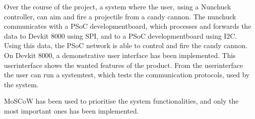 \noindent Over the course of the project, a system where the user, using a Nunchuck controller, can aim and fire a projectile from a candy cannon. The nunchuck communicates with a PSoC developmentboard, which processes and forwards the data to Devkit 8000 using SPI, and to a PSoC developmentboard using I2C. Using this data, the PSoC network is able to control and fire the candy cannon. On Devkit 8000, a demonstrative user interface has been implemented. This userinterface shows the wanted features of the product. From the userinterface the user can run a systemtest, which tests the communication protocols, used by the system.

\noindent MoSCoW has been used to prioritise the system functionalities, and only the most important ones has been implemented.